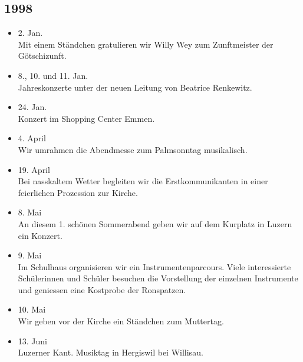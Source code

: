 \subsection*{1998}
\begin{history}


    \begin{itemize}

        \item 2. Jan.\\
              Mit einem Ständchen gratulieren wir Willy Wey zum Zunftmeister der
              Götschizunft.

        \item 8., 10. und 11. Jan.\\
              Jahreskonzerte unter der neuen Leitung von Beatrice Renkewitz.

        \item 24. Jan.\\
              Konzert im Shopping Center Emmen.

        \item 4. April\\
              Wir umrahmen die Abendmesse zum Palmsonntag musikalisch.

        \item 19. April\\
              Bei nasskaltem Wetter begleiten wir die Erstkommunikanten in einer
              feierlichen Prozession zur Kirche.

        \item 8. Mai\\
              An diesem 1. schönen Sommerabend geben wir auf dem Kurplatz in Luzern
              ein Konzert.

        \item 9. Mai\\
              Im Schulhaus organisieren wir ein Instrumentenparcours. Viele
              interessierte Schülerinnen und Schüler besuchen die Vorstellung der
              einzelnen Instrumente und geniessen eine Kostprobe der Ronspatzen.

        \item 10. Mai\\
              Wir geben vor der Kirche ein Ständchen zum Muttertag.

        \item 13. Juni\\
              Luzerner Kant. Musiktag in Hergiswil bei Willisau.


\end{itemize}
\end{history}
